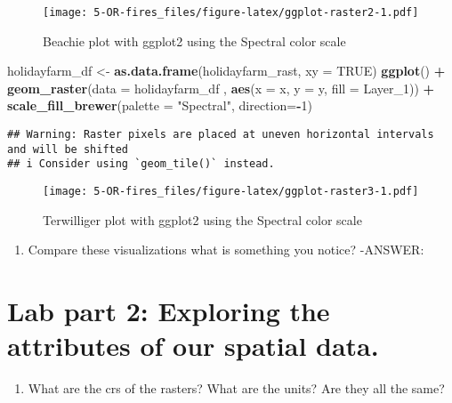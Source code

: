 \documentclass[
]{article}
\newenvironment{Shaded}{\begin{snugshade}}{\end{snugshade}}
\newcommand{\AttributeTok}[1]{\textcolor[rgb]{0.13,0.29,0.53}{#1}}
\newcommand{\ConstantTok}[1]{\textcolor[rgb]{0.56,0.35,0.01}{#1}}
\newcommand{\DecValTok}[1]{\textcolor[rgb]{0.00,0.00,0.81}{#1}}
\newcommand{\FunctionTok}[1]{\textcolor[rgb]{0.13,0.29,0.53}{\textbf{#1}}}
\newcommand{\NormalTok}[1]{#1}
\newcommand{\OtherTok}[1]{\textcolor[rgb]{0.56,0.35,0.01}{#1}}
\newcommand{\SpecialCharTok}[1]{\textcolor[rgb]{0.81,0.36,0.00}{\textbf{#1}}}
\newcommand{\StringTok}[1]{\textcolor[rgb]{0.31,0.60,0.02}{#1}}
\providecommand{\tightlist}{%
  \setlength{\itemsep}{0pt}\setlength{\parskip}{0pt}}
\begin{document}
\begin{figure}
\centering
\texttt{[image: 5-OR-fires\_files/figure-latex/ggplot-raster2-1.pdf]}
\caption{Beachie plot with ggplot2 using the Spectral color scale}
\end{figure}

\begin{Shaded}
\begin{Highlighting}[]
\NormalTok{holidayfarm\_df }\OtherTok{\textless{}{-}} \FunctionTok{as.data.frame}\NormalTok{(holidayfarm\_rast, }\AttributeTok{xy =} \ConstantTok{TRUE}\NormalTok{)}
\FunctionTok{ggplot}\NormalTok{() }\SpecialCharTok{+}
    \FunctionTok{geom\_raster}\NormalTok{(}\AttributeTok{data =}\NormalTok{ holidayfarm\_df , }\FunctionTok{aes}\NormalTok{(}\AttributeTok{x =}\NormalTok{ x, }\AttributeTok{y =}\NormalTok{ y, }\AttributeTok{fill =}\NormalTok{ Layer\_1)) }\SpecialCharTok{+}
    \FunctionTok{scale\_fill\_brewer}\NormalTok{(}\AttributeTok{palette =} \StringTok{"Spectral"}\NormalTok{, }\AttributeTok{direction=}\SpecialCharTok{{-}}\DecValTok{1}\NormalTok{)}
\end{Highlighting}
\end{Shaded}

\begin{verbatim}
## Warning: Raster pixels are placed at uneven horizontal intervals and will be shifted
## i Consider using `geom_tile()` instead.
\end{verbatim}

\begin{figure}
\centering
\texttt{[image: 5-OR-fires\_files/figure-latex/ggplot-raster3-1.pdf]}
\caption{Terwilliger plot with ggplot2 using the Spectral color scale}
\end{figure}

\begin{enumerate}
\def\labelenumi{\alph{enumi}.}
\setcounter{enumi}{3}
\tightlist
\item
  Compare these visualizations what is something you notice? -ANSWER:
\end{enumerate}

\hypertarget{lab-part-2-exploring-the-attributes-of-our-spatial-data.}{%
\section{Lab part 2: Exploring the attributes of our spatial
data.}\label{lab-part-2-exploring-the-attributes-of-our-spatial-data.}}

\begin{enumerate}
\def\labelenumi{\alph{enumi}.}
\tightlist
\item
  What are the crs of the rasters? What are the units? Are they all the
  same?
\end{enumerate}
\end{document}
